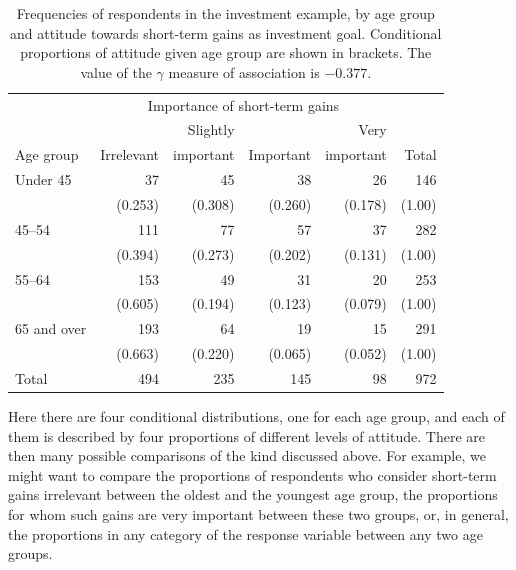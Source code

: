 \begin{table}
\caption{Frequencies of respondents in the investment example, by age group and
attitude towards short-term gains as investment goal.
Conditional proportions of attitude given age group are shown in
brackets. The value of the $\gamma$ measure of association is $-0.377$.}
\label{t_investors}
\begin{center}
\begin{tabular}{|l|rrrr|r|}\hline
& \multicolumn{4}{|c|}{Importance of short-term gains} & \\
 & & Slightly & & Very & \\
Age group & Irrelevant & important & Important & important & Total \\ \hline
Under 45 &  37 &  45 &  38 &  26 & 146 \\
 &  (0.253) & (0.308) & (0.260) & (0.178) & (1.00) \\
45--54 &  111 &  77 &  57 &  37 & 282 \\
 &  (0.394) & (0.273) & (0.202) & (0.131) & (1.00) \\
55--64 & 153 &  49 &  31 &  20 & 253 \\
 & (0.605) & (0.194) & (0.123) & (0.079) & (1.00)  \\
65 and over &  193 &  64 &  19 &  15 & 291 \\
 & (0.663) & (0.220) & (0.065) & (0.052) & (1.00)  \\
\hline
Total & 494 & 235 & 145 & 98 & 972 \\
\hline
\end{tabular}
\end{center}
\vspace*{-3ex}
\end{table}

Here there are four conditional distributions, one for each age group,
and each of them is described by four proportions of different levels of
attitude. There are then many possible comparisons of the kind discussed
above. For example, we might want to compare the proportions of
respondents who consider short-term gains irrelevant between the oldest
and the youngest age group, the proportions for whom such gains are very
important between these two groups, or, in general, the proportions in
any category of the response variable between any two age groups.


